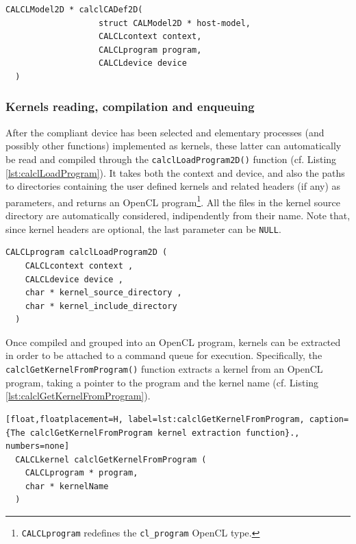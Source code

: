 
\begin{lstlisting}[float,floatplacement=H, label=lst:calclCADef2D, caption=The calclCADef2D data structure., numbers=none]
  CALCLModel2D * calclCADef2D(
                   struct CALModel2D * host-model,
                   CALCLcontext context,
                   CALCLprogram program,
                   CALCLdevice device
  )
\end{lstlisting}


\subsubsection{Kernels reading, compilation and enqueuing}

After the compliant device has been selected and elementary processes
(and possibly other functions) implemented as kernels, these latter
can automatically be read and compiled through the
\verb'calclLoadProgram2D()' function (cf. Listing
\ref{lst:calclLoadProgram}). It takes both the context and device, and
also the paths to directories containing the user defined kernels and
related headers (if any) as parameters, and returns an OpenCL
program\footnote{\texttt{CALCLprogram} redefines the
  \texttt{cl\_program} OpenCL type.}. All the files in the kernel
source directory are automatically considered, indipendently from
their name. Note that, since kernel headers are optional, the last
parameter can be \verb'NULL'.

\begin{lstlisting}[float,floatplacement=H, label=lst:calclLoadProgram, caption={The calclLoadProgramLib function. It loads and compiles kernels by returning an OpenCL program.}, numbers=none]
  CALCLprogram calclLoadProgram2D (
    CALCLcontext context ,
    CALCLdevice device ,
    char * kernel_source_directory ,
    char * kernel_include_directory
  )
\end{lstlisting}

Once compiled and grouped into an OpenCL program, kernels can be
extracted in order to be attached to a command queue for
execution. Specifically, the \verb'calclGetKernelFromProgram()'
function extracts a kernel from an OpenCL program, taking a pointer to
the program and the kernel name (cf. Listing
\ref{lst:calclGetKernelFromProgram}).

\begin{lstlisting}[float,floatplacement=H, label=lst:calclGetKernelFromProgram, caption={The calclGetKernelFromProgram kernel extraction function}., numbers=none]
  CALCLkernel calclGetKernelFromProgram (
    CALCLprogram * program,
    char * kernelName 
  )
\end{lstlisting}

